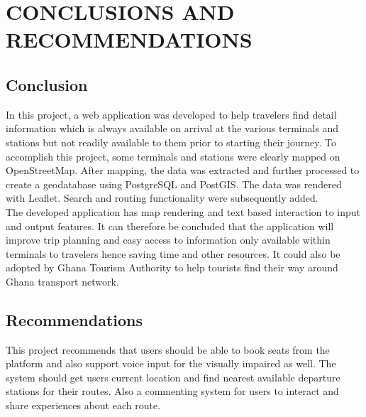 
\chapter{CONCLUSIONS AND RECOMMENDATIONS} %



\ifpdf
    \graphicspath{{5/figures/PNG/}{5/figures/PDF/}{5/figures/}}
\else
    \graphicspath{{5/figures/EPS/}{5/figures/}}
\fi

\section{Conclusion}
In this project, a web application was developed to help travelers find detail information which is always available on arrival at the various terminals and stations but not readily available to them prior to starting their journey. To accomplish this project, some terminals and stations were clearly mapped on OpenStreetMap. After mapping, the data was extracted and further processed to create a geodatabase using PostgreSQL and PostGIS. The data was rendered with Leaflet. Search and routing functionality were subsequently added.\\ The developed application has map rendering and text based interaction to input and output features. It can therefore be concluded that the application will improve trip planning and easy access to information only available within terminals to travelers hence saving time and other resources. It could also be adopted by Ghana Tourism Authority to help tourists find their way around Ghana transport network.


\section{Recommendations}
This project recommends that users should be able to book seats from the platform and also support voice input for the visually impaired as well. The system should get users current location and find nearest available departure stations for their routes. Also a commenting system for users to interact and share experiences about each route.


